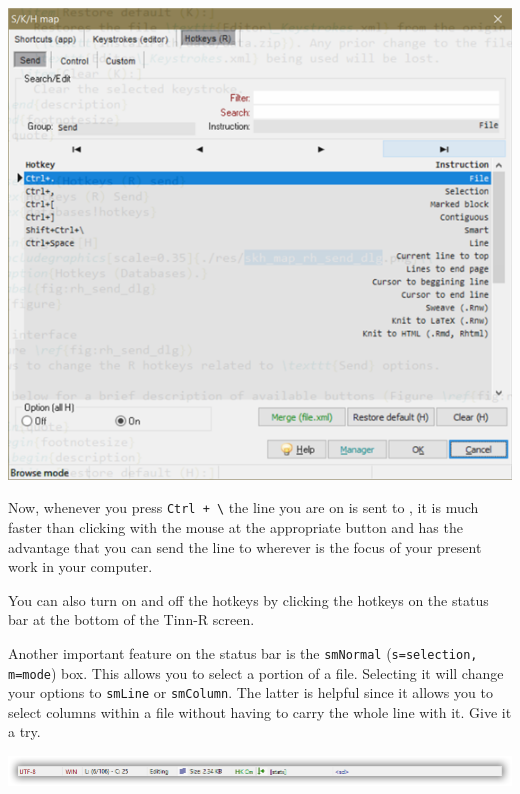 \vspace{5mm}
\includegraphics[scale=0.8]{./res/dlg_skh_map_rh_send.png}\\
\vspace{5mm}

Now, whenever you press \texttt{Ctrl + \textbackslash{}} the line you are on is sent to \RR{},
it is much faster than clicking with the mouse at the appropriate button and has the advantage
that you can send the line to \RR{} wherever is the focus of your present work in your computer.

You can also turn on and off the hotkeys by clicking the hotkeys on the status bar at the bottom of the Tinn-R screen.

Another important feature on the status bar is the \texttt{smNormal} (\texttt{s=selection, m=mode}) box.
This allows you to select a portion of a file.
Selecting it will change your options to \texttt{smLine} or \texttt{smColumn}.
The latter is helpful since it allows you to select columns within a file without having to carry the whole line with it.
Give it a try.

\vspace{5mm}
\includegraphics[width=\headwidth]{./res/status_bar.png}\\
\vspace{5mm}

